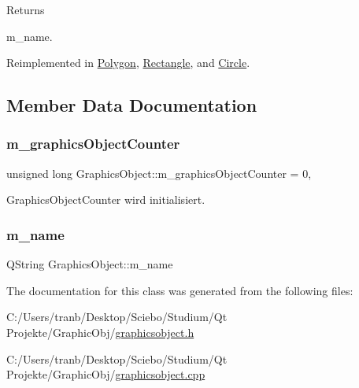 \begin{DoxyReturn}{Returns}


m\+\_\+name. 
\end{DoxyReturn}


Reimplemented in \hyperlink{class_polygon_a588df36c92bfa626e0a16acb07162fa3}{Polygon}, \hyperlink{class_rectangle_a75b1e77ef828ff8de86cfcf6b03bfadb}{Rectangle}, and \hyperlink{class_circle_a2fea55f4310daa23eb8c103bdcdcabd6}{Circle}.



\subsection{Member Data Documentation}
\mbox{\label{class_graphics_object_a09b02b61e4f9c5aefed46c3625cb98ed}} 
\subsubsection{\texorpdfstring{m\+\_\+graphics\+Object\+Counter}{m\_graphicsObjectCounter}}
{\footnotesize\ttfamily unsigned long Graphics\+Object\+::m\+\_\+graphics\+Object\+Counter = 0\hspace{0.3cm}{\ttfamily [static]}, {\ttfamily [protected]}}



Graphics\+Object\+Counter wird initialisiert. 

\mbox{\label{class_graphics_object_aaa6fae9a6fac8fd912b3bf5b3c98fc26}} 
\subsubsection{\texorpdfstring{m\+\_\+name}{m\_name}}
{\footnotesize\ttfamily Q\+String Graphics\+Object\+::m\+\_\+name\hspace{0.3cm}{\ttfamily [protected]}}



The documentation for this class was generated from the following files\+:\begin{DoxyCompactItemize}
\item 
C\+:/\+Users/tranb/\+Desktop/\+Sciebo/\+Studium/\+Qt Projekte/\+Graphic\+Obj/\hyperlink{graphicsobject_8h}{graphicsobject.\+h}\item 
C\+:/\+Users/tranb/\+Desktop/\+Sciebo/\+Studium/\+Qt Projekte/\+Graphic\+Obj/\hyperlink{graphicsobject_8cpp}{graphicsobject.\+cpp}\end{DoxyCompactItemize}
